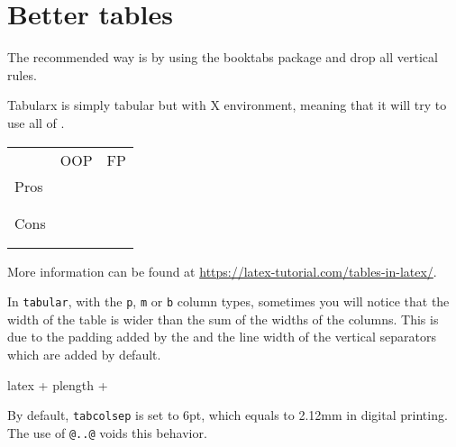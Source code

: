 \section{Better tables}
The recommended way is by using the booktabs package and drop all vertical rules.

Tabularx is simply tabular but with X environment, meaning that it will try to use all of \texttt{\linewidth}.

\begin{center}
  \begin{tabularx}{\linewidth}{l*{2}{X}}
    \toprule
         & OOP & FP \\
    \cmidrule(lr){2-3}
    Pros &     &    \\
         &     &    \\
         &     &    \\
    \midrule
    Cons &     &    \\
         &     &    \\
         &     &    \\
    \bottomrule
  \end{tabularx}
\end{center}

More information can be found at \url{https://latex-tutorial.com/tables-in-latex/}.

In \texttt{tabular}, with the \texttt{p}, \texttt{m} or \texttt{b} column types, sometimes you will notice that the width of the table is wider than the sum of the widths of the columns.
This is due to the padding added by the \texttt{\tabcolsep} and the line width of the vertical separators which are added by default.

\begin{code}{latex}
  \tabcolsep + p{length} + \tabcolsep
\end{code}

By default, \texttt{tabcolsep} is set to 6pt, which equals to 2.12mm in digital printing.
The use of \texttt{@{}..@{}} voids this behavior.
